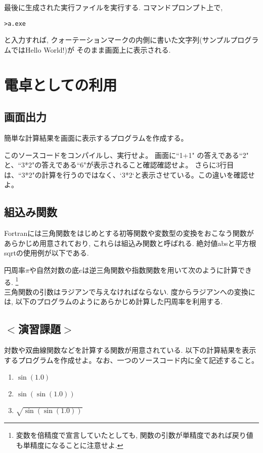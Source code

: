 最後に生成された実行ファイルを実行する. コマンドプロンプト上で,
\begin{Verbatim}[frame=single]
>a.exe
\end{Verbatim}
と入力すれば, クォーテーションマークの内側に書いた文字列(サンプルプログラムではHello World!)が
そのまま画面上に表示される.

\section{電卓としての利用}
\subsection*{画面出力}
簡単な計算結果を画面に表示するプログラムを作成する。

このソースコードをコンパイルし、実行せよ。
画面に``1+1" の答えである``2" と、``3*2"の答えである``6"が表示されること確認確認せよ。
さらに3行目は、``3*2"の計算を行うのではなく、`3*2`と表示させている。この違いを確認せよ。


\subsection*{組込み関数}
Fortranには三角関数をはじめとする初等関数や変数型の変換をおこなう関数があらかじめ用意されており,
これらは組込み関数と呼ばれる.
絶対値absと平方根sqrtの使用例が以下である.


円周率$\pi$や自然対数の底$e$は逆三角関数や指数関数を用いて次のように計算できる.
\footnote{変数を倍精度で宣言していたとしても, 関数の引数が単精度であれば戻り値も単精度になることに注意せよ.} \\


三角関数の引数はラジアンで与えなければならない.
度からラジアンへの変換には, 以下のプログラムのようにあらかじめ計算した円周率を利用する.


\subsection*{$<$演習課題$>$}
対数や双曲線関数などを計算する関数が用意されている.
以下の計算結果を表示するプログラムを作成せよ。なお、一つのソースコード内に全て記述すること。
\begin{enumerate}
\item $\sin(1.0)$
\item $\sin(\sin(1.0))$
\item $\sqrt{\sin(\sin(1.0))}$
\end{enumerate}

